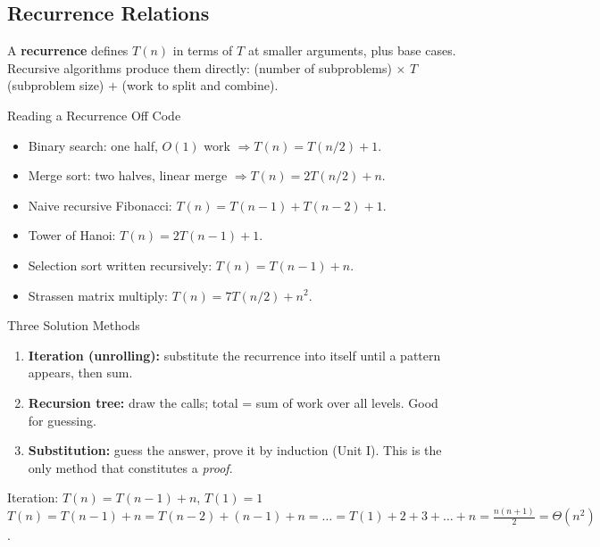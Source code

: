 \documentclass[11pt,a4paper]{article}
\begin{document}
\subsection{Recurrence Relations}

\begin{definition}
A \textbf{recurrence} defines $T(n)$ in terms of $T$ at smaller arguments, plus base cases. Recursive algorithms produce them directly: (number of subproblems) $\times$ $T$(subproblem size) $+$ (work to split and combine).
\end{definition}

\begin{keyconcept}{Reading a Recurrence Off Code}
\begin{itemize}
    \item Binary search: one half, $O(1)$ work $\Rightarrow T(n) = T(n/2) + 1$.
    \item Merge sort: two halves, linear merge $\Rightarrow T(n) = 2T(n/2) + n$.
    \item Naive recursive Fibonacci: $T(n) = T(n-1) + T(n-2) + 1$.
    \item Tower of Hanoi: $T(n) = 2T(n-1) + 1$.
    \item Selection sort written recursively: $T(n) = T(n-1) + n$.
    \item Strassen matrix multiply: $T(n) = 7T(n/2) + n^2$.
\end{itemize}
\end{keyconcept}

\begin{keyconcept}{Three Solution Methods}
\begin{enumerate}
    \item \textbf{Iteration (unrolling):} substitute the recurrence into itself until a pattern appears, then sum.
    \item \textbf{Recursion tree:} draw the calls; total = sum of work over all levels. Good for guessing.
    \item \textbf{Substitution:} guess the answer, prove it by induction (Unit I). This is the only method that constitutes a \emph{proof}.
\end{enumerate}
\end{keyconcept}

\begin{worked}{Iteration: $T(n) = T(n-1) + n$, $T(1) = 1$}
$T(n) = T(n-1) + n = T(n-2) + (n-1) + n = \dots = T(1) + 2 + 3 + \dots + n = \frac{n(n+1)}{2} = \Theta(n^2)$.
\end{worked}
\end{document}
